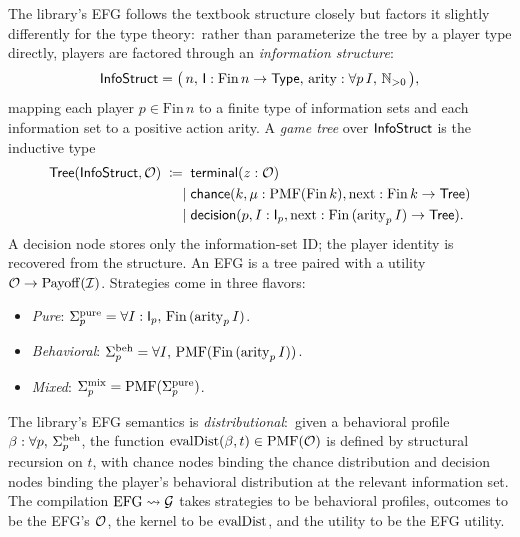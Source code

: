 The library's EFG follows the textbook structure closely but
factors it slightly differently for the type theory:\ rather than
parameterize the tree by a player type directly, players are
factored through an \emph{information structure}:
\begin{equation}
\label{eq:infostructure}
  \mathsf{InfoStruct} = \bigl(\,n,\,\mathsf{I} : \mathrm{Fin}\,n \to \mathsf{Type},\,
                       \mathrm{arity} : \forall p\,I,\,\mathbb{N}_{>0}\,\bigr),
\end{equation}
mapping each player $p \in \mathrm{Fin}\,n$ to a finite type of
information sets and each information set to a positive action
arity.  A \emph{game tree} over $\mathsf{InfoStruct}$ is the inductive
type
\begin{equation}
\label{eq:gametree}
\begin{aligned}
  \mathsf{Tree}(\mathsf{InfoStruct}, \mathcal{O}) \;\coloneqq\;\;
    &\mathsf{terminal}(z : \mathcal{O}) \\
  \mid\;& \mathsf{chance}(k, \mu : \mathrm{PMF}(\mathrm{Fin}\,k), \mathrm{next} : \mathrm{Fin}\,k \to \mathsf{Tree}) \\
  \mid\;& \mathsf{decision}(p, I : \mathsf{I}_p, \mathrm{next} : \mathrm{Fin}\,(\mathrm{arity}_p\,I) \to \mathsf{Tree}).
\end{aligned}
\end{equation}
A decision node stores only the information-set ID; the player
identity is recovered from the structure.  An EFG is a tree paired
with a utility $\mathcal{O} \to \mathrm{Payoff}(\mathcal{I})$.  Strategies come
in three flavors:
\begin{itemize}\itemsep2pt
\item \emph{Pure}: $\Sigma^{\mathrm{pure}}_p = \forall I : \mathsf{I}_p,\, \mathrm{Fin}\,(\mathrm{arity}_p\,I)$.
\item \emph{Behavioral}: $\Sigma^{\mathrm{beh}}_p = \forall I,\, \mathrm{PMF}(\mathrm{Fin}\,(\mathrm{arity}_p\,I))$.
\item \emph{Mixed}: $\Sigma^{\mathrm{mix}}_p = \mathrm{PMF}(\Sigma^{\mathrm{pure}}_p)$.
\end{itemize}

The library's EFG semantics is \emph{distributional}:\ given a
behavioral profile $\beta : \forall p,\, \Sigma^{\mathrm{beh}}_p$, the function
$\mathrm{evalDist}(\beta, t) \in \mathrm{PMF}(\mathcal{O})$ is defined by structural
recursion on $t$, with chance nodes binding the chance distribution
and decision nodes binding the player's behavioral distribution at
the relevant information set.  The compilation
$\mathrm{EFG} \rightsquigarrow \mathcal{G}$ takes strategies to be behavioral profiles,
outcomes to be the EFG's $\mathcal{O}$, the kernel to be $\mathrm{evalDist}$,
and the utility to be the EFG utility.

